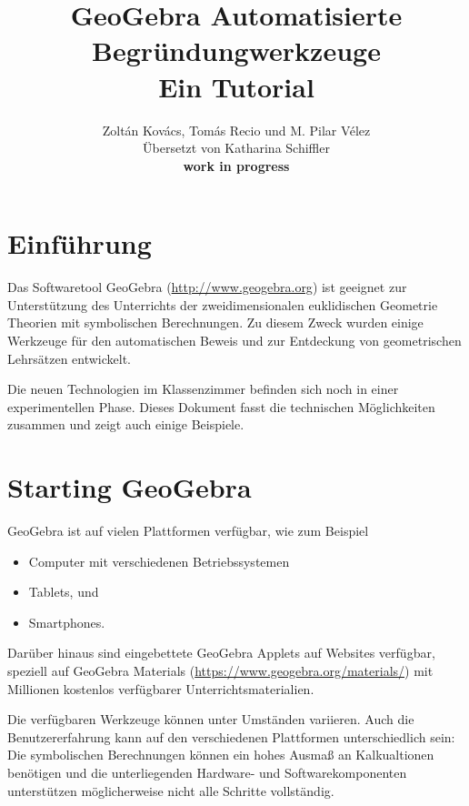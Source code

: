 \documentclass{article}
\title{GeoGebra Automatisierte Begründungwerkzeuge\\ \large Ein Tutorial}
\author{Zolt\'an Kov\'acs, Tom\'as Recio und M. Pilar V\'elez\\
Übersetzt von Katharina Schiffler\\
\textbf{work in progress}
}
\begin{document}

\maketitle

\section{Einführung}

Das Softwaretool GeoGebra (\url{http://www.geogebra.org}) ist geeignet zur Unterstützung des Unterrichts der zweidimensionalen euklidischen Geometrie Theorien mit symbolischen Berechnungen. Zu diesem Zweck wurden einige Werkzeuge für den automatischen Beweis und zur Entdeckung von geometrischen Lehrsätzen entwickelt.

Die neuen Technologien im Klassenzimmer befinden sich noch in einer experimentellen Phase. Dieses Dokument fasst die technischen Möglichkeiten zusammen und zeigt auch einige Beispiele.

\section{Starting GeoGebra}

GeoGebra ist auf vielen Plattformen verfügbar, wie zum Beispiel
\begin{itemize}
    \item Computer mit verschiedenen Betriebssystemen
    \item Tablets, und
    \item Smartphones.
\end{itemize}
Darüber hinaus sind eingebettete GeoGebra Applets auf Websites verfügbar, speziell auf GeoGebra Materials (\url{https://www.geogebra.org/materials/}) mit Millionen kostenlos verfügbarer Unterrichtsmaterialien.

Die verfügbaren Werkzeuge können unter Umständen variieren. Auch die Benutzererfahrung kann auf den verschiedenen Plattformen unterschiedlich sein: Die symbolischen Berechnungen können ein hohes Ausmaß an Kalkualtionen benötigen und die unterliegenden Hardware- und Softwarekomponenten unterstützen möglicherweise nicht alle Schritte vollständig.
\end{document}
